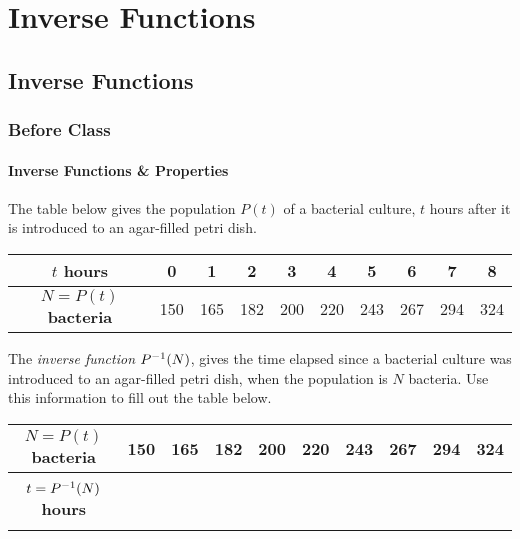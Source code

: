 \documentclass[notes]{subfiles}
\begin{document}
	\chapter{Inverse Functions}
	\fancyhead[LO,RE]{\bfseries \small \currentname}
	\fancyfoot[C]{{}}
	\fancyfoot[RO,LE]{\large \thepage}	%
	
\section*{Inverse Functions}\label{cs61}
	\subsection*{Before Class}
	\subsubsection*{Inverse Functions \& Properties}
		\begin{ex}
			The table below gives the population $P(t)$ of a bacterial culture, $t$ hours after it is introduced to an agar-filled petri dish.
			\begin{center}
				\begin{tabular}{|c|c|c|c|c|c|c|c|c|c|}\hline
					$t$ \textbf{hours}		& 0	&1	&2	&3	&4	&5	&6	&7	&8 \\ \hline
					$N =P(t)$ \textbf{bacteria}	&150	&165	&182	&200	&220	&243	&267	&294	&324\\ \hline
				\end{tabular}
			\end{center}
			The \emph{inverse function} $P^{-1}(N)$, gives the time elapsed since a bacterial culture was introduced to an agar-filled petri dish, when the population is $N$ bacteria.  Use this information to fill out the table below.
			\begin{center}
				\begin{tabular}{|c|P{.4in}|P{.4in}|P{.4in}|P{.4in}|P{.4in}|P{.4in}|P{.4in}|P{.4in}|P{.4in}|}\hline
					$N =P(t)$ \textbf{bacteria}	&150	&165	&182	&200	&220	&243	&267	&294	&324\\ \hline
					& & & & & & & &  &\\
					$t = P^{-1}(N)$ \textbf{hours}& & & & & & & &  & \\ 
					& & & & & & & &  &\\ \hline
				\end{tabular}
			\end{center}
		\end{ex}
			
\end{document}
